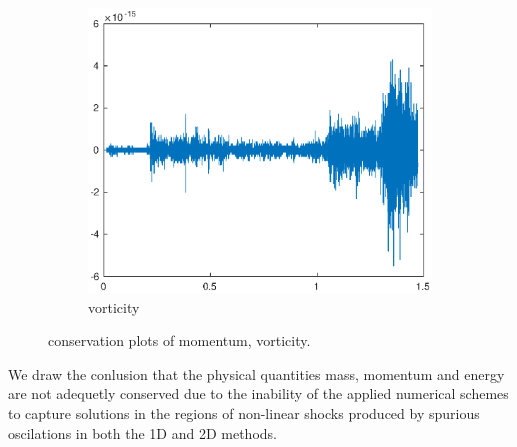 \begin{figure}[h!]
\begin{subfigure}[b]{0.9\textwidth}
        \includegraphics[width=1.1\textwidth,height=0.52\textwidth]{images/cons_vort.eps}\hfill
        \caption{vorticity}
        \label{Momentum}
    \end{subfigure}
    \caption{conservation plots of momentum, vorticity.}
    \label{fig:2Dcons_B}
\end{figure}

We draw the conlusion that the physical quantities mass, momentum and energy are not adequetly conserved due to the inability of
the applied numerical schemes to capture solutions in the regions of non-linear shocks produced by
spurious oscilations \cite{Lax} in both the 1D and 2D methods.
